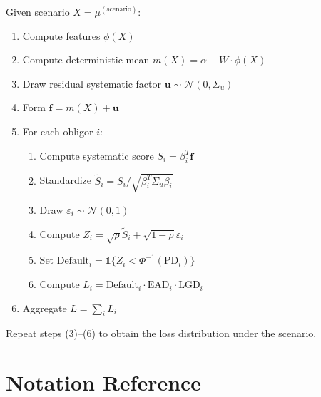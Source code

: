 \documentclass[11pt,a4paper]{article}
\begin{document}
Given scenario $X = \mu^{(\text{scenario})}$:

\begin{enumerate}
    \item Compute features $\phi(X)$
    \item Compute deterministic mean $m(X) = \alpha + W \cdot \phi(X)$
    \item Draw residual systematic factor $\mathbf{u} \sim \mathcal{N}(0, \Sigma_u)$
    \item Form $\mathbf{f} = m(X) + \mathbf{u}$
    \item For each obligor $i$:
    \begin{enumerate}
        \item Compute systematic score $S_i = \beta_i^T \mathbf{f}$
        \item Standardize $\tilde{S}_i = S_i / \sqrt{\beta_i^T \Sigma_u \beta_i}$
        \item Draw $\varepsilon_i \sim \mathcal{N}(0,1)$
        \item Compute $Z_i = \sqrt{\rho} \tilde{S}_i + \sqrt{1-\rho} \varepsilon_i$
        \item Set $\text{Default}_i = \mathbb{1}\{Z_i < \Phi^{-1}(\text{PD}_i)\}$
        \item Compute $L_i = \text{Default}_i \cdot \text{EAD}_i \cdot \text{LGD}_i$
    \end{enumerate}
    \item Aggregate $L = \sum_i L_i$
\end{enumerate}

Repeat steps (3)--(6) to obtain the loss distribution under the scenario.

\section{Notation Reference}
\end{document}
